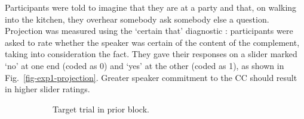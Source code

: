 \documentclass[11pt,fleqn]{article}
\newcommand{\figref}[1]{Fig.~\ref{#1}}
\newcommand{\6}{\mbox{$[\hspace*{-.6mm}[$}}
\newcommand{\9}{\mbox{$]\hspace*{-.6mm}]$}}
\begin{document}
Participants were told to imagine that they are at a party and that, on walking into the kitchen, they overhear somebody ask somebody else a question. Projection was measured using the `certain that' diagnostic \cite{djaerv-bacovcin-salt27,tbd-variability, lorson2018, mahler2020}: participants were asked to rate whether the speaker was certain of the content of the complement, taking into consideration the fact. They gave their responses on a slider marked `no' at one end (coded as 0) and `yes' at the other (coded as 1), as shown in \figref{fig-exp1-projection}. Greater speaker commitment to the CC should result in higher slider ratings.

\begin{figure}[h!]
\centering

\begin{subfigure}[t]{0.5\textwidth}
        \centering
{}
\caption{Target trial in prior block.}\label{fig-exp1-prior}
\end{subfigure}%
\begin{subfigure}[t]{0.5\textwidth}
\centering
{} 

\end{subfigure}
\end{figure}
\end{document}
